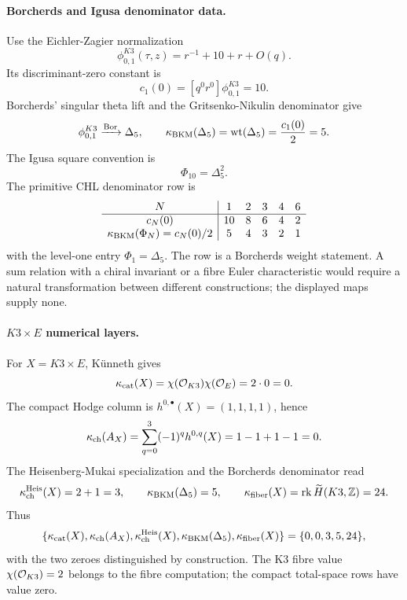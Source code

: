 \paragraph{Borcherds and Igusa denominator data.}
Use the Eichler-Zagier normalization
\[
 \phi_{0,1}^{K3}(\tau,z)=r^{-1}+10+r+O(q).
\]
Its discriminant-zero constant is
\[
 c_1(0)=[q^0r^0]\phi_{0,1}^{K3}=10 .
\]
Borcherds' singular theta lift and the Gritsenko-Nikulin denominator give
\[
 \phi_{0,1}^{K3}
 \xrightarrow{\operatorname{Bor}}
 \Delta_5,\qquad
 \kappa_{\mathrm{BKM}}(\Delta_5)=\mathrm{wt}(\Delta_5)=\frac{c_1(0)}{2}=5 .
\]
The Igusa square convention is
\[
 \Phi_{10}=\Delta_5^2 .
\]
The primitive CHL denominator row is
\[
\begin{array}{c|ccccc}
N&1&2&3&4&6\\ \hline
c_N(0)&10&8&6&4&2\\
\kappa_{\mathrm{BKM}}(\Phi_N)=c_N(0)/2&5&4&3&2&1
\end{array}
\]
with the level-one entry \(\Phi_1=\Delta_5\).  The row is a Borcherds
weight statement.  A sum relation with a chiral invariant or a fibre
Euler characteristic would require a natural transformation between
different constructions; the displayed maps supply none.

\paragraph{\texorpdfstring{$K3\times E$}{K3 x E} numerical layers.}
For \(X=K3\times E\), K\"unneth gives
\[
 \kappa_{\mathrm{cat}}(X)=\chi(\mathcal{O}_{K3})\chi(\mathcal{O}_E)=2\cdot0=0.
\]
The compact Hodge column is \(h^{0,\bullet}(X)=(1,1,1,1)\), hence
\[
 \kappa_{\mathrm{ch}}(A_X)=\sum_{q=0}^{3}(-1)^qh^{0,q}(X)=1-1+1-1=0.
\]
The Heisenberg-Mukai specialization and the Borcherds denominator read
\[
 \kappa_{\mathrm{ch}}^{\mathrm{Heis}}(X)=2+1=3,\qquad
 \kappa_{\mathrm{BKM}}(\Delta_5)=5,\qquad
 \kappa_{\mathrm{fiber}}(X)=\operatorname{rk}\widetilde H(K3,\mathbb{Z})=24 .
\]
Thus
\[
 \{\kappa_{\mathrm{cat}}(X),\kappa_{\mathrm{ch}}(A_X),\kappa_{\mathrm{ch}}^{\mathrm{Heis}}(X),
   \kappa_{\mathrm{BKM}}(\Delta_5),\kappa_{\mathrm{fiber}}(X)\}
 =
 \{0,0,3,5,24\},
\]
with the two zeroes distinguished by construction.  The K3 fibre value
\(\chi(\mathcal{O}_{K3})=2\) belongs to the fibre computation; the compact
total-space rows have value zero.

